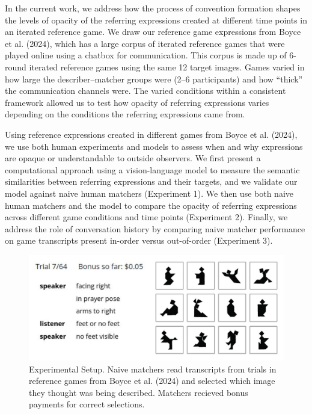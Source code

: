 \documentclass[10pt, letterpaper]{article}
\begin{document}
In the current work, we address how the process of convention formation
shapes the levels of opacity of the referring expressions created at
different time points in an iterated reference game. We draw our
reference game expressions from Boyce et al. (2024), which has a large
corpus of iterated reference games that were played online using a
chatbox for communication. This corpus is made up of 6-round iterated
reference games using the same 12 target images. Games varied in how
large the describer--matcher groups were (2--6 participants) and how
``thick'' the communication channels were. The varied conditions within
a consistent framework allowed us to test how opacity of referring
expressions varies depending on the conditions the referring expressions
came from.

Using reference expressions created in different games from Boyce et al.
(2024), we use both human experiments and models to assess when and why
expressions are opaque or understandable to outside observers. We first
present a computational approach using a vision-language model to
measure the semantic similarities between referring expressions and
their targets, and we validate our model against naive human matchers
(Experiment 1). We then use both naive human matchers and the model to
compare the opacity of referring expressions across different game
conditions and time points (Experiment 2). Finally, we address the role
of conversation history by comparing naive matcher performance on game
transcripts present in-order versus out-of-order (Experiment 3).

\begin{CodeChunk}
\begin{figure}[t!]

{\centering \includegraphics[width=1\linewidth]{matcher-diagram} 

}

\caption[Experimental Setup]{Experimental Setup. Naive matchers read transcripts from trials in reference games from Boyce et al. (2024) and selected which image they thought was being described. Matchers recieved bonus payments for correct selections. \label{game}}\label{fig:interface}
\end{figure}
\end{CodeChunk}
\end{document}
